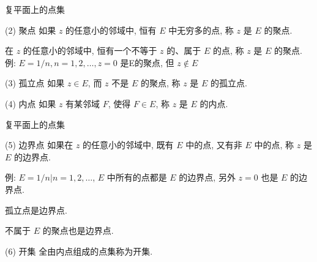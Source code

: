 \documentclass{beamer}
\begin{document}
\begin{frame}{复平面上的点集}
\begin{alertblock}{(2) 聚点}
如果 $ z $ 的任意小的邻域中, 恒有 $ E $ 中无穷多的点, 称 $ z $ 是 $ E $ 的聚点. 

在 $ z $ 的任意小的邻域中, 恒有一个不等于 $ z $ 的、属于 $ E $ 的点, 称 $ z $ 是 $ E $ 的聚点. 
例: $ E={1/n}, n=1, 2, \dots, z=0 $ 是E的聚点, 但 $ z\notin E $ 

\end{alertblock}

\begin{alertblock}{(3) 孤立点}
如果 $ z\in E $, 而 $ z $ 不是 $ E $ 的聚点, 称 $ z $ 是 $ E $ 的孤立点. 

\end{alertblock}

\begin{alertblock}{(4) 内点}
如果 $ z $ 有某邻域 $ F $, 使得 $ F\in E $, 称 $ z $ 是 $ E $ 的内点. 
\end{alertblock}

\end{frame}

\begin{frame}{复平面上的点集}
\begin{alertblock}{(5) 边界点}
	如果在 $ z $ 的任意小的邻域中, 既有 $ E $ 中的点, 又有非 $ E $ 中的点, 称 $ z $ 是 $ E $ 的边界点. 
	
	例: $ E={1/n| n=1, 2, \dots} $,  $ E $ 中所有的点都是 $ E $ 的边界点, 另外 $ z=0 $ 也是 $ E $ 的边界点. 
	
	孤立点是边界点. 
	
	不属于 $ E $ 的聚点也是边界点. 
\end{alertblock}

\begin{alertblock}{(6) 开集}
全由内点组成的点集称为开集. 

\end{alertblock}


\end{frame}
\end{document}
